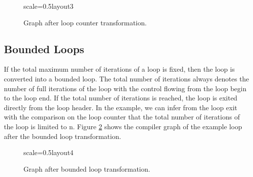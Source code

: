 \documentclass[twocolumn]{svjour3}
\begin{document}
\begin{figure}[h]
  \centering
\begin{digraphenv}{scale=0.5}{layout3}
\end{digraphenv}
  \caption{Graph after loop counter transformation.}
  \label{fig:loop3}
\end{figure}

\subsection{Bounded Loops}

If the total maximum number of iterations of a loop is fixed, then the loop is converted into a bounded loop.
The total number of iterations always denotes the number of full iterations of the loop with the control flowing from the loop begin to the loop end.
If the total number of iterations is reached, the loop is exited directly from the loop header.
In the example, we can infer from the loop exit with the comparison on the loop counter that the total number of iterations of the loop is limited to n.
Figure \ref{fig:loop4} shows the compiler graph of the example loop after the bounded loop transformation.

\begin{figure}[h]
  \centering
\begin{digraphenv}{scale=0.5}{layout4}
\end{digraphenv}
  \caption{Graph after bounded loop transformation.}
  \label{fig:loop4}
\end{figure}
\end{document}
